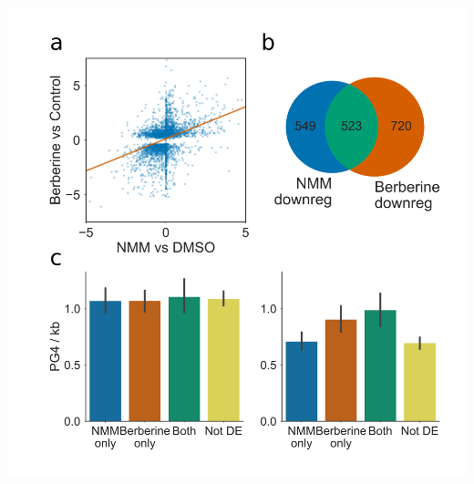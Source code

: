 \documentclass[12pt,a4paper,]{report}
\let\origfigure=\figure
\let\endorigfigure=\endfigure
\renewenvironment{figure}[1][2] {
    \expandafter\origfigure\expandafter[H]
} {
    \endorigfigure
}
\begin{document}
\begin{figure}[htbp]
\centering
\includegraphics[width=\textwidth,height=562pt,keepaspectratio]{chapter_5/figures/nmm_berberine.png}
\caption[Comparison of gene expression during NMM treatment with expression during Berberine treatment.]{\textbf{Comparison   of   gene   expression   during   NMM   treatment   with   expression   during   Berberine   treatment.}   \textbf{a)}   Scatter   plot   with   regression   line   showing   the   correlation   in   expression   change   for   NMM   vs   DMSO   and   Berberine   vs   Control.   Processed   Berberine   data   was   taken   from   supplementary   information   of   Nakagawa   et   al. 2012,   however   only   differentially   regulated   genes   were   reported.   \textbf{b)}   Venn   diagram   reporting   the   overlap   of   genes   downregulated   by   NMM   with   those   downregulated   by   Berberine.   \textbf{c)}   Bar   plot   showing   the   average   exonic   PG4   densities   of   NMM   and   Berberine   downregulated   genesets,   on   the   coding   and   template   strands,   respectively.   Both   genesets   show   an   greater   exonic   G4   density   on   the   template   strand   than   genes   not   regulated   by   either   drug,   however   genes   which   are   regulated   by   both   drugs   had   the   greatest   average   exonic   PG4.   Bar   colours   match   set   colours   from   Fig   3b.   Errorbars   are   68\%   confidence   intervals   for   mean   generated   using   1000   bootstrapped   samples.   \label{berberine}}

\end{figure}
\end{document}
